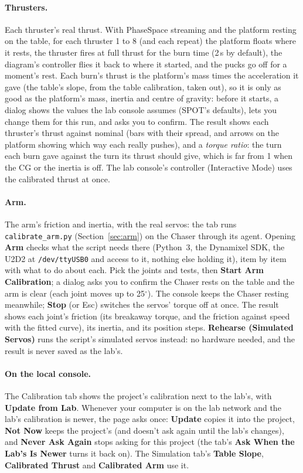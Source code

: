 \documentclass[11pt,a4paper]{article}
\newcommand{\ui}[1]{\textsf{\textbf{#1}}}
\newcommand{\pth}[1]{\texttt{#1}}
\begin{document}
\paragraph{Thrusters.} Each thruster's real thrust. With PhaseSpace streaming and the platform resting on the table,
for each thruster 1 to 8 (and each repeat) the platform floats where it rests, the thruster fires at full thrust for
the burn time (2\,s by default), the diagram's controller flies it back to where it started, and the pucks go off
for a moment's rest. Each burn's thrust is the platform's mass times the acceleration it gave (the table's slope,
from the table calibration, taken out), so it is only as good as the platform's mass, inertia and centre of
gravity: before it starts, a dialog shows the values the lab console assumes (SPOT's defaults), lets you change them
for this run, and asks you to confirm. The result shows each thruster's thrust against nominal (bars with their
spread, and arrows on the platform showing which way each really pushes), and a \emph{torque ratio}: the turn each
burn gave against the turn its thrust should give, which is far from 1 when the CG or the inertia is off. The lab
console's controller (Interactive Mode) uses the calibrated thrust at once.

\paragraph{Arm.} The arm's friction and inertia, with the real servos: the tab runs \pth{calibrate\_arm.py} (Section~\ref{sec:arm})
on the Chaser through its agent. Opening \ui{Arm} checks what the script needs there (Python~3, the Dynamixel SDK, the
U2D2 at \pth{/dev/ttyUSB0} and access to it, nothing else holding it), item by item with what to do about each. Pick
the joints and tests, then \ui{Start Arm Calibration}; a dialog asks you to confirm the Chaser rests on the table and
the arm is clear (each joint moves up to 25$^\circ$). The console keeps the Chaser resting meanwhile; \ui{Stop} (or
Esc) switches the servos' torque off at once. The result shows each joint's friction (its breakaway torque, and the
friction against speed with the fitted curve), its inertia, and its position steps. \ui{Rehearse (Simulated Servos)}
runs the script's simulated servos instead: no hardware needed, and the result is never saved as the lab's.

\paragraph{On the local console.} The Calibration tab shows the project's calibration next to the lab's, with
\ui{Update from Lab}. Whenever your computer is on the lab network and the lab's calibration is newer, the page asks
once: \ui{Update} copies it into the project, \ui{Not Now} keeps the project's (and doesn't ask again until the lab's
changes), and \ui{Never Ask Again} stops asking for this project (the tab's \ui{Ask When the Lab's Is Newer} turns it
back on). The Simulation tab's \ui{Table Slope}, \ui{Calibrated Thrust} and \ui{Calibrated Arm} use it.
\end{document}
